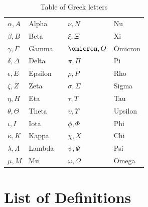 \documentclass[openany,leqno,11pt]{book}
\theoremstyle{break}
\theoremstyle{definition}
\theoremstyle{remark}
\begin{document}
\begin{table}[h] \begin{center}
	\begin{tabular}{llcll}
		\toprule
		$\alpha, A$ & Alpha && $\nu, N$ & Nu\\
		$\beta, B$ & Beta && $\xi, \Xi$ & Xi\\
		$\gamma, \Gamma$ & Gamma && $\omicron, O$ & Omicron\\
		$\delta, \Delta$ & Delta && $\pi, \Pi$ & Pi\\
		$\epsilon, E$ & Epsilon && $\rho, P$& Rho\\
		$\zeta, Z$ & Zeta && $\sigma, \Sigma$ & Sigma\\
		$\eta, H$ & Eta && $\tau, T$ & Tau\\
		$\theta, \Theta$ & Theta && $\upsilon, \Upsilon$ & Upsilon\\
		$\iota, I$ & Iota && $\phi, \Phi$ & Phi\\
		$\kappa, K$ & Kappa && $\chi, X$ & Chi\\
		$\lambda, \Lambda$ & Lambda && $\psi, \Psi$ & Psi\\
		$\mu, M$ & Mu && $\omega, \Omega$ & Omega \\ 
    \bottomrule
	\end{tabular}
\end{center} \caption{Table of Greek letters}
\end{table}

\twocolumn
\chapter{List of Definitions}\label{defns}
{\small  {}}



\newpage
{}
\end{document}
